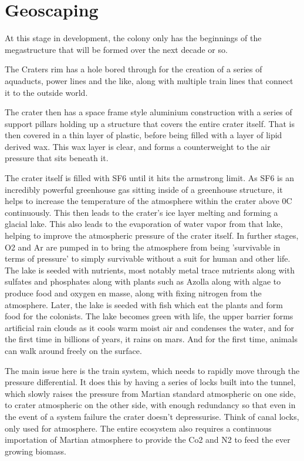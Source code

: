 \documentclass[10pt]{article}
\begin{document}
\section{Geoscaping}
At this stage in development, the colony only has the beginnings of the megastructure that will be formed over the next decade or so.

The Craters rim has a hole bored through for the creation of a series of aquaducts, power lines and the like, along with multiple train lines that connect it to the outside world.

The crater then has a space frame style aluminium construction with a series of support pillars holding up a structure that covers the entire crater itself. That is then covered in a thin layer of plastic, before being filled with a layer of lipid derived wax. This wax layer is clear, and forms a counterweight to the air pressure that sits beneath it.

The crater itself is filled with SF6 until it hits the armstrong limit. As SF6 is an incredibly powerful greenhouse gas sitting inside of a greenhouse structure, it helps to increase the temperature of the atmosphere within the crater above 0C continuously. This then leads to the crater's ice layer melting and forming a glacial lake. This also leads to the evaporation of water vapor from that lake, helping to improve the atmospheric pressure of the crater itself. In further stages, O2 and Ar are pumped in to bring the atmosphere from being 'survivable in terms of pressure' to simply survivable without a suit for human and other life. The lake is seeded with nutrients, most notably metal trace nutrients along with sulfates and phosphates along with plants such as Azolla along with algae to produce food and oxygen en masse, along with fixing nitrogen from the atmosphere. Later, the lake is seeded with fish which eat the plants and form food for the colonists. The lake becomes green with life, the upper barrier forms artificial rain clouds as it cools warm moist air and condenses the water, and for the first time in billions of years, it rains on mars. And for the first time, animals can walk around freely on the surface.

The main issue here is the train system, which needs to rapidly move through the pressure differential. It does this by having a series of locks built into the tunnel, which slowly raises the pressure from Martian standard atmospheric on one side, to crater atmospheric on the other side, with enough redundancy so that even in the event of a system failure the crater doesn't depressurise. Think of canal locks, only used for atmosphere. The entire ecosystem also requires a continuous importation of Martian atmosphere to provide the Co2 and N2 to feed the ever growing biomass.
\end{document}
